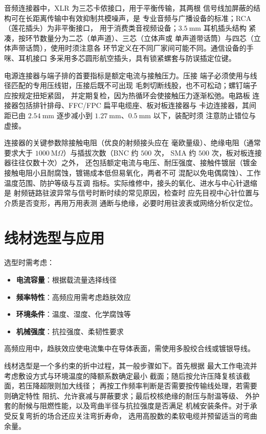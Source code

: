 音频连接器中，XLR 为三芯卡侬接口，用于平衡传输，其两根
信号线加屏蔽的结构可在长距离传输中有效抑制共模噪声，是
专业音频与广播设备的标准；RCA（莲花插头）为非平衡接口，
用于消费类音视频设备；$3.5\ \mathrm{mm}$ 耳机插头结构
紧凑，按环节数量分为二芯（单声道）、三芯（立体声或
单声道带话筒）与四芯（立体声带话筒），使用时须注意各
环节定义在不同厂家间可能不同。通信设备的手咪、耳机接口
多采用多芯圆形航空插头，具有锁紧螺套与防误插定位键。

电源连接器与端子排的首要指标是额定电流与接触压力。压接
端子必须使用与线径匹配的专用压线钳，压接后既不可出现
毛刺切断线股，也不可松动；螺钉端子应按规定扭矩紧固，
并定期复检，因为热循环会使接触压力逐渐松弛。电路板
连接器包括排针排母、FFC/FPC 扁平电缆座、板对板连接器与
卡边连接器，其间距已由 $2.54\ \mathrm{mm}$ 逐步减小到
$1.27\ \mathrm{mm}$、$0.5\ \mathrm{mm}$ 以下，装配时须
注意防止错位与虚接。

连接器的关键参数除接触电阻（优良的射频接头应在
毫欧量级）、绝缘电阻（通常要求大于
$1000\ \mathrm{M}\Omega$）与插拔次数（BNC 约 $500$ 次，
SMA 约 $500$ 次，板对板连接器往往仅数十次）之外，
还包括额定电流与电压、耐压强度、接触件镀层（镀金
接触电阻小且耐腐蚀，镀锡成本低但易氧化，两者不可
混配以免电偶腐蚀）、工作温度范围、防护等级与互调
指标。实际维修中，接头的氧化、进水与中心针退缩是
射频链路驻波异常与信号时断时续的常见原因，检查时
应先目视中心针位置与介质是否变形，再用万用表测
通断与绝缘，必要时用驻波表或网络分析仪定位。

\section{线材选型与应用}
\label{sec:wiring_selection}

选型时需考虑：

\begin{itemize}
    \item \textbf{电流容量}：根据载流量选择线径
    \item \textbf{频率特性}：高频应用需考虑趋肤效应
    \item \textbf{环境条件}：温度、湿度、化学腐蚀等
    \item \textbf{机械强度}：抗拉强度、柔韧性要求
\end{itemize}

高频应用中，趋肤效应使电流集中在导体表面，需使用多股绞合线或镀银导线。

线材选型是一个多约束的折中过程，其一般步骤如下。首先根据
最大工作电流并考虑敷设方式与环境温度的降额系数确定最小
截面；随后按允许压降复核该截面，若压降超限则加大线径；
再按工作频率判断是否需要按传输线处理，若需要则确定特性
阻抗、允许衰减与屏蔽要求；最后校核绝缘的耐压与耐温等级、
外护套的耐候与阻燃性能，以及弯曲半径与抗拉强度是否满足
机械安装条件。对于承受反复弯折的场合还应关注弯折寿命，
选用高股数的柔软电缆并预留适当的弯曲余量。

